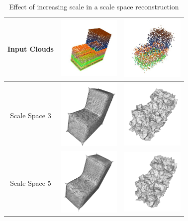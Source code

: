 \documentclass[12pt]{drexelthesis}
\begin{document}
\begin{table}[!ht]
	\centering
	\caption[Effect of increasing scale in a scale space reconstruction]{Effect of increasing scale in a scale space reconstruction}
	\begin{tabular}{ | c | c | c | }
	\hline
	Input Clouds 	& \includegraphics[width=3cm]{l_block_pt_cloud.jpg}
					& \includegraphics[width=3cm]{l_block_pt_cloud10pnoise.jpg}
	\\
	\hline
	Scale Space 3 	& \includegraphics[width=3cm]{scalespace/clean/scalespace3.png} 
					& \includegraphics[width=3cm]{scalespace/10pnoise/scale3.png}
	\\
	\hline
	Scale Space 5 	& \includegraphics[width=3cm]{scalespace/clean/scalespace5.png} 
					& \includegraphics[width=3cm]{scalespace/10pnoise/scale5.png}

\end{tabular}
\end{table}
\end{document}
